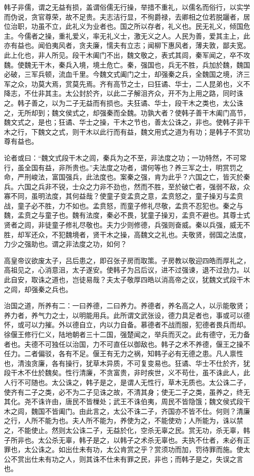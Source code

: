 \documentclass[]{article}
\begin{document}
韩子非儒，谓之无益有损，盖谓俗儒无行操，举措不重礼，以儒名而俗行，以实学而伪说，贪官尊荣，故不足贵。夫志洁行显，不徇爵禄，去卿相之位若脱躧者，居位治职，功虽不立，此礼义为业者也。国之所以存者，礼义也。民无礼义，倾国危主。今儒者之操，重礼爱义，率无礼义士，激无义之人。人民为善，爱其主上，此亦有益也。闻伯夷风者，贪夫廉，懦夫有立志；闻柳下惠风者，薄夫敦，鄙夫宽。此上化也，非人所见。段干木阖门不出，魏文敬之，表式其闾，秦军闻之，卒不攻魏。使魏无干木，秦兵入境，境土危亡。秦，强国也，兵无不胜，兵加於魏，魏国必破，三军兵顿，流血千里。今魏文式阖门之士，却强秦之兵，全魏国之境，济三军之众，功莫大焉，赏莫先焉。齐有高节之士，曰狂谲、华士，二人昆弟也，义不降志，不仕非其主。太公封於齐，以此二子解沮齐众，开不为上用之路，同时诛之。韩子善之，以为二子无益而有损也。夫狂谲、华士，段干木之类也，太公诛之，无所却到；魏文侯式之，却强秦而全魏。功孰大者？使韩子善干木阖门高节，魏文式之，是也；狂谲、华士之操，干木之节也，善太公诛之，非也。使韩子非干木之行，下魏文之式，则干木以此行而有益，魏文用式之道为有功；是韩子不赏功尊有益也。

论者或曰：``魏文式段干木之闾，秦兵为之不至，非法度之功；一功特然，不可常行，虽全国有益，非所贵也。''夫法度之功者，谓何等也？养三军之士，明赏罚之命，严刑峻法，富国强兵，此法度也。案秦之强，肯为此乎？六国之亡，皆灭於秦兵。六国之兵非不锐，士众之力非不劲也，然而不胜，至於破亡者，强弱不敌，众寡不同，虽明法度，其何益哉？使童子变孟贲之意，孟贲怒之，童子操刃与孟贲战，童子必不胜，力不如也。孟贲怒，而童子修礼尽敬，孟贲不忍犯也。秦之与魏，孟贲之与童子也。魏有法度，秦必不畏，犹童子操刃，孟贲不避也。其尊士式贤者之闾，非徒童子修礼尽敬也。夫力少则修德，兵强则奋威。秦以兵强，威无不胜，却军还众，不犯魏境者，贤干木之操，高魏文之礼也。夫敬贤，弱国之法度，力少之强助也。谓之非法度之功，如何？

高皇帝议欲废太子，吕后患之，即召张子房而取策。子房教以敬迎四皓而厚礼之，高祖见之，心消意沮，太子遂安。使韩子为吕后议，进不过强谏，退不过劲力。以此自安，取诛之道也，岂徒易哉？夫太子敬厚四皓以消高帝之议，犹魏文式段干木之闾，却强秦之兵也。

治国之道，所养有二：一曰养德，二曰养力。养德者，养名高之人，以示能敬贤；养力者，养气力之士，以明能用兵。此所谓文武张设，德力具足者也，事或可以德怀，或可以力摧。外以德自立，内以力自备。慕德者不战而服，犯德者畏兵而却。徐偃王修行仁义，陆地朝者三十二国，强楚闻之，举兵而灭之。此有德守，无力备者也。夫德不可独任以治国，力不可直任以御敌也。韩子之术不养德，偃王之操不任力。二者偏驳，各有不足。偃王有无力之祸，知韩子必有无德之患。凡人禀性也，清浊贪廉，各有操行，犹草木异质，不可复变易也。狂谲、华士不仕於齐，犹段干木不仕於魏矣。性行清廉，不贪富贵，非时疾世，义不苟仕，虽不诛此人，此人行不可随也。太公诛之，韩子是之，是谓人无性行，草木无质也。太公诛二子，使齐有二子之类，必不为二子见诛之故，不清其身；使无二子之类，虽养之，终无其化。尧不诛许由，唐民不皆樔处；武王不诛伯夷，周民不皆隐饿；魏文侯式段干木之闾，魏国不皆阖门。由此言之，太公不诛二子，齐国亦不皆不仕。何则？清廉之行，人所不能为也。夫人所不能为，养使为之，不能使劝；人所能为，诛以禁之，不能使止。然则太公诛二子，无益於化，空杀无辜之民。赏无功，杀无辜，韩子所非也。太公杀无辜，韩子是之，以韩子之术杀无辜也。夫执不仕者，未必有正罪也，太公诛之。如出仕未有功，太公肯赏之乎？赏须功而加，罚待罪而施。使太公不赏出仕未有功之人，则其诛不仕未有罪之民，非也；而韩子是之，失误之言也。
\end{document}
